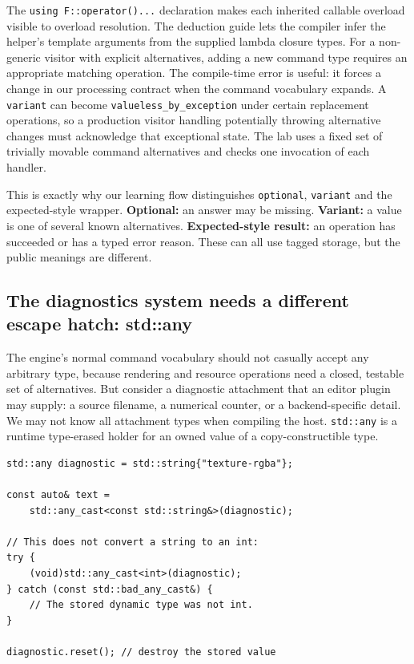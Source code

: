 The \texttt{using\ F::operator()...} declaration makes each inherited callable overload visible to overload resolution. The deduction guide lets the compiler infer the helper's template arguments from the supplied lambda closure types. For a non-generic visitor with explicit alternatives, adding a new command type requires an appropriate matching operation. The compile-time error is useful: it forces a change in our processing contract when the command vocabulary expands. A \texttt{variant} can become \texttt{valueless\_by\_exception} under certain replacement operations, so a production visitor handling potentially throwing alternative changes must acknowledge that exceptional state. The lab uses a fixed set of trivially movable command alternatives and checks one invocation of each handler.

This is exactly why our learning flow distinguishes \texttt{optional}, \texttt{variant} and the expected-style wrapper. \textbf{Optional:} an answer may be missing. \textbf{Variant:} a value is one of several known alternatives. \textbf{Expected-style result:} an operation has succeeded or has a typed error reason. These can all use tagged storage, but the public meanings are different.

\subsection{The diagnostics system needs a different escape hatch: std::any}\label{01-foundations-i-ch006-the-diagnostics-system-needs-a-different-escape-hatch-stdany}

The engine's normal command vocabulary should not casually accept any arbitrary type, because rendering and resource operations need a closed, testable set of alternatives. But consider a diagnostic attachment that an editor plugin may supply: a source filename, a numerical counter, or a backend-specific detail. We may not know all attachment types when compiling the host. \texttt{std::any} is a runtime type-erased holder for an owned value of a copy-constructible type.

\begin{verbatim}
std::any diagnostic = std::string{"texture-rgba"};

const auto& text =
    std::any_cast<const std::string&>(diagnostic);

// This does not convert a string to an int:
try {
    (void)std::any_cast<int>(diagnostic);
} catch (const std::bad_any_cast&) {
    // The stored dynamic type was not int.
}

diagnostic.reset(); // destroy the stored value
\end{verbatim}


